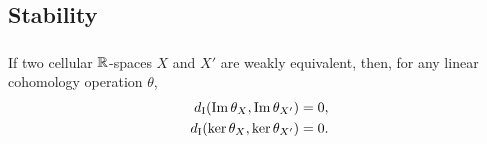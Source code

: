 \subsection{Stability}\label{ss:stability}




%
%

\subsubsection{}\label{lem:w.h.e. preservance}
\lemma If two cellular $\mathbb{R}$-spaces $X$ and $X'$ are weakly equivalent, then, for any linear cohomology operation $\theta$,
\[
\begin{split}
	d_{\mathrm{I}}(\operatorname{Im}\theta_{X}, \operatorname{Im}\theta_{X'}) &= 0, \\
	d_{\mathrm{I}}(\ker\theta_{X}, \ker\theta_{X'}) &= 0.
\end{split}
\]


